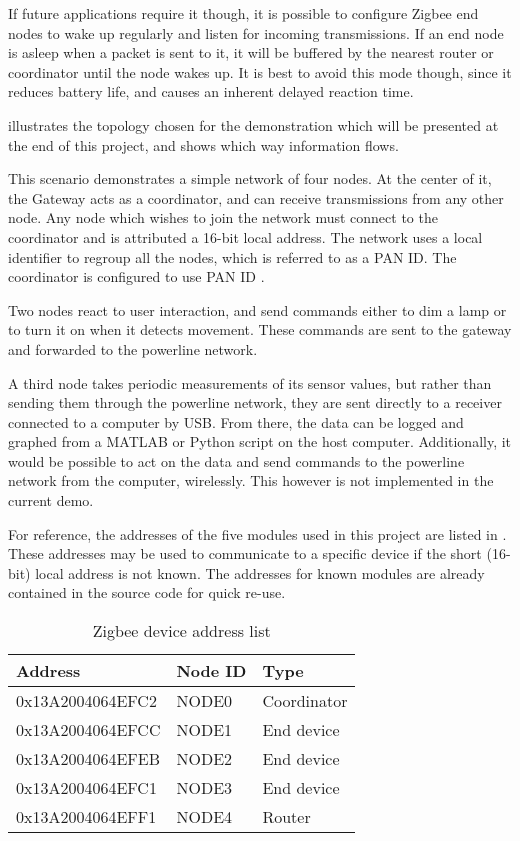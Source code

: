 If future applications require it though, it is possible to configure Zigbee end
nodes to wake up regularly and listen for incoming transmissions. If an end node
is asleep when a packet is sent to it, it will be buffered by the nearest router
or coordinator until the node wakes up. It is best to avoid this mode though,
since it reduces battery life, and causes an inherent delayed reaction time.

 illustrates the topology chosen for the demonstration
which will be presented at the end of this project, and shows which way
information flows. 


This scenario demonstrates a simple network of four nodes. At the center of it,
the Gateway acts as a coordinator, and can receive transmissions from any other
node. Any node which wishes to join the network must connect to the coordinator
and is attributed a 16-bit local address. The network uses a local identifier to
regroup all the nodes, which is referred to as a PAN ID. The coordinator is
configured to use PAN ID .

Two nodes react to user interaction, and send commands either to dim a lamp or
to turn it on when it detects movement. These commands are sent to the gateway
and forwarded to the powerline network.

A third node takes periodic measurements of its sensor values, but rather than
sending them through the powerline network, they are sent directly to a receiver
connected to a computer by USB. From there, the data can be logged and graphed
from a MATLAB or Python script on the host computer. Additionally, it would be
possible to act on the data and send commands to the powerline network from the
computer, wirelessly. This however is not implemented in the current demo.

For reference, the addresses of the five modules used in this project are listed
in . These addresses may be used to communicate to a specific
device if the short (16-bit) local address is not known. The addresses for known
modules are already contained in the source code for quick re-use.

\begin{table}[h]
  \centering
  \begin{tabular}{l|l|l}
    Address & Node ID & Type \\
    \hline
    0x13A2004064EFC2 & NODE0 & Coordinator \\
    0x13A2004064EFCC & NODE1 & End device \\
    0x13A2004064EFEB & NODE2 & End device \\
    0x13A2004064EFC1 & NODE3 & End device \\
    0x13A2004064EFF1 & NODE4 & Router \\
  \end{tabular}
  \caption{Zigbee device address list}
  \label{tab:addresses}
\end{table}

